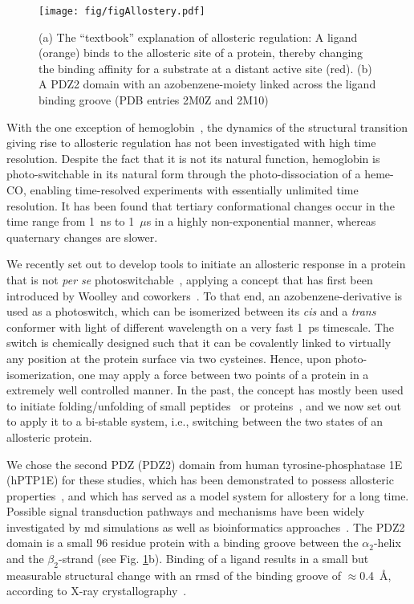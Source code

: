 \documentclass[journal=jacsat,manuscript=article]{achemso}
\begin{document}
\begin{figure}[h]
\centering
\texttt{[image: fig/figAllostery.pdf]}
\caption{(a) The ``textbook'' explanation of allosteric regulation: A
  ligand (orange) binds to the allosteric site of a protein, thereby
  changing the binding affinity for a substrate at a distant active
  site (red). (b) A PDZ2 domain with an azobenzene-moiety linked
  across the ligand binding groove (PDB entries 2M0Z and 2M10)}
\label{figAllostery}
\end{figure}

With the one exception of hemoglobin~\cite{Eaton99}, the dynamics of
the structural transition giving rise to allosteric regulation has not
been investigated with high time resolution. Despite the fact that it
is not its natural function, hemoglobin is photo-switchable in its
natural form through the photo-dissociation of a heme-CO, enabling
time-resolved experiments with essentially unlimited time
resolution. It has been found that tertiary conformational changes
occur in the time range from 1~ns to 1~$\mu$s in a highly
non-exponential manner, whereas quaternary changes are slower.

We recently set out to develop tools to initiate an allosteric
response in a protein that is not \textit{per se}
photoswitchable~\cite{buchli13,waldauer14,buchenberg14}, applying a
concept that has first been introduced by Woolley and
coworkers~\cite{kum00, woolley05, beharry11}. To that end, an
azobenzene-derivative is used as a photoswitch, which can be
isomerized between its \textit{cis} and a \textit{trans} conformer
with light of different wavelength on a very fast 1~ps timescale. The
switch is chemically designed such that it can be covalently linked to
virtually any position at the protein surface via two
cysteines. Hence, upon photo-isomerization, one may apply a force
between two points of a protein in a extremely well controlled
manner. In the past, the concept has mostly been used to initiate
folding/unfolding of small peptides~\cite{ihalainen08,schrader07} or
proteins~\cite{zhang09}, and we now set out to apply it to a bi-stable
system, i.e., switching between the two states of an allosteric
protein.

We chose the second PDZ (PDZ2) domain from human tyrosine-phosphatase
1E (hPTP1E) for these studies, which has been demonstrated to possess
allosteric properties~\cite{fuentes04}, and which has served as a
model system for allostery for a long time. Possible signal
transduction pathways and mechanisms have been widely investigated by
md simulations as well as bioinformatics approaches~\cite{Ota05,
  DeLosRios05,sharp06, Dhulesia08, Kong09, Gerek11,
  Cilia12,lockless99,suel03,Chi08}. The PDZ2 domain is a small 96
residue protein with a binding groove between the $\alpha_2$-helix and
the $\beta_2$-strand (see Fig. \ref{figAllostery}b). Binding of a
ligand results in a small but measurable structural change with an
rmsd of the binding groove of $\approx$0.4~\AA, according to X-ray
crystallography~\cite{zhang10}.
\end{document}
